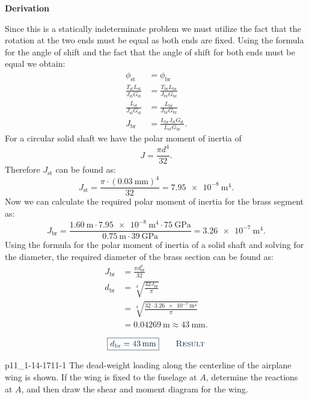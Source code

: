 \documentclass[a4paper]{article}
\newcounter{problem}
\numberwithin{equation}{problem}
\newcommand{\AUheading}[1]{%
  \par\vspace{.4\baselineskip}%
  {\sffamily\bfseries\color{AUblueDark}#1\par}%
  \nobreak%
}
\newenvironment{derivation}[1][Derivation]{%
  \AUheading{#1}
  \begingroup\allowdisplaybreaks
  \setlength{\abovedisplayskip}{6pt}%
  \setlength{\belowdisplayskip}{6pt}%
  \setlength{\abovedisplayshortskip}{4pt}%
  \setlength{\belowdisplayshortskip}{4pt}%
}{\par\endgroup\medskip}
\newcommand{\finalresult}[1]{%
  \vspace{.2\baselineskip}%
  \begin{equation}
    {\color{AUblueDark}\boxed{\displaystyle #1}}
    \tag*{\textsc{\textcolor{AUblueDark}{Result}}}
  \end{equation}
  \newpage
}
\begin{document}
\begin{derivation}
  Since this is a statically indeterminate problem we must utilize the fact that the rotation at the two ends must be equal as both ends are fixed.
  Using the formula for the angle of shift and the fact that the angle of shift for both ends must be equal we obtain:
  \begin{align*}
    \phi_{\mathrm{st}} &= \phi_{\mathrm{br}} \\
    \frac{T_{\mathrm{st}} L_{\mathrm{st}}}{J_{\mathrm{st}} G_{\mathrm{st}}} &= \frac{T_{\mathrm{br}} L_{\mathrm{br}}}{J_{\mathrm{br}} G_{\mathrm{br}}} \\
    \frac{L_{\mathrm{st}}}{J_{\mathrm{st}} G_{\mathrm{st}}} &= \frac{L_{\mathrm{br}}}{J_{\mathrm{br}} G_{\mathrm{br}}} \\
    J_{\mathrm{br}} &= \frac{L_{\mathrm{br}} J_{\mathrm{st}} G_{\mathrm{st}}}{L_{\mathrm{st}} G_{\mathrm{br}}}
  .\end{align*}
  For a circular solid shaft we have the polar moment of inertia of
  \[ 
  J = \frac{\pi d ^{4}}{32}
  .\]
  Therefore $J_{\mathrm{st}}$ can be found as:
  \[ 
  J_{\mathrm{st}} = \frac{\pi \cdot \left( \qty{0,03}{\mm}  \right)^{4}}{32} = \qty{7,95e-8}{\m^{4}} 
  .\]
  Now we can calculate the required polar moment of inertia for the brass segment as:
  \[ 
  J_{\mathrm{br}} = \frac{\qty{1,60}{\m} \cdot \qty{7,95e-8}{\m^{4}} \cdot \qty{75}{\GPa}}{\qty{0,75}{\m} \cdot \qty{39}{\GPa} } = \qty{3,26e-7}{\m^{4}} 
  .\]
  Using the formula for the polar moment of inertia of a solid shaft and solving for the diameter, the required diameter of the brass section can be found as:
  \begin{align*}
    J_{\mathrm{br}} &= \frac{\pi d_{\mathrm{br}}^{4}}{32} \\
    d_{\mathrm{br}} &= \sqrt[4]{\frac{32 J_{\mathrm{br}}}{\pi}} \\
           &= \sqrt[4]{\frac{32 \cdot \qty{3,26e-7}{\m^{4}}}{\pi}} \\
           &= \qty{0,04269}{\m} \approx \qty{43}{\mm} 
  .\end{align*}
\end{derivation}

\finalresult{d_{\mathrm{br}} = \qty{43}{\mm}}

\begin{problemwithimage}{p11_1-14-17}{11-1}
  The dead-weight loading along the centerline of the airplane wing is shown.
  If the wing is fixed to the fuselage at $A$, determine the reactions at $A$, and then draw the shear and moment diagram for the wing.
\end{problemwithimage}
\end{document}
